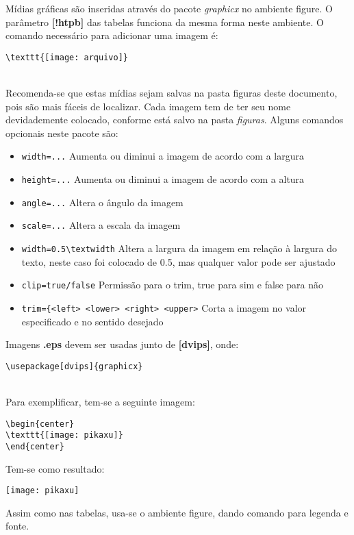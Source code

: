 Mídias gráficas são inseridas através do pacote \textit{graphicx} no ambiente figure. O parâmetro \textbf{[!htpb]} das tabelas funciona da mesma forma neste ambiente.
O comando necessário para adicionar uma imagem é:\\
\begin{verbatim}
\texttt{[image: arquivo]}
\end{verbatim}\\
Recomenda-se que estas mídias sejam salvas na pasta figuras deste documento, pois são mais fáceis de localizar. Cada imagem tem de ter seu nome devidademente colocado, conforme está salvo na pasta \textit{figuras}.
Alguns comandos opcionais neste pacote são:
\begin{itemize}
\item \verb|width=...| Aumenta ou diminui a imagem de acordo com a largura
\item \verb|height=...| Aumenta ou diminui a imagem de acordo com a altura
\item \verb|angle=...| Altera o ângulo da imagem
\item \verb|scale=...| Altera a escala da imagem
\item \verb|width=0.5\textwidth| Altera a largura da imagem em relação à largura do texto, neste caso foi colocado de 0.5, mas qualquer valor pode ser ajustado
\item \verb|clip=true/false| Permissão para o trim, true para sim e false para não
\item \verb|trim={<left> <lower> <right> <upper>| Corta a imagem no valor especificado e no sentido desejado
\end{itemize}
Imagens \textbf{.eps} devem ser usadas junto de \textbf{[dvips]}, onde:
\begin{verbatim}
\usepackage[dvips]{graphicx}
\end{verbatim}\\
Para exemplificar, tem-se a seguinte imagem:
\begin{verbatim}
\begin{center}
\texttt{[image: pikaxu]}
\end{center}
\end{verbatim}
Tem-se como resultado:\\
\begin{center}
\texttt{[image: pikaxu]}
\end{center}

Assim como nas tabelas, usa-se o ambiente figure, dando comando para legenda e fonte.

